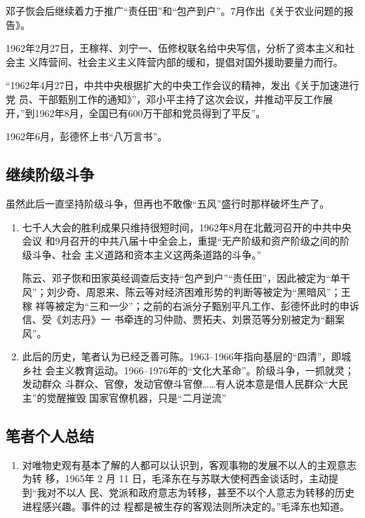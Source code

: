 {\begin{enumerate}
  邓子恢会后继续着力于推广“责任田”和“包产到户”。7月作出《关于农业问题的报
  告》。

  1962年2月27日，王稼祥、刘宁一、伍修权联名给中央写信，分析了资本主义和社会主
  义阵营间、社会主义主义阵营内部的缓和，提倡对国外援助要量力而行。

  “1962年4月27日，中共中央根据扩大的中央工作会议的精神，发出《关于加速进行党
  员、干部甄别工作的通知》”，邓小平主持了这次会议，并推动平反工作展
  开，”到1962年8月，全国已有600万干部和党员得到了平反”。

  1962年6月，彭德怀上书“八万言书”。
\end{enumerate}

\subsection{继续阶级斗争}

虽然此后一直坚持阶级斗争，但再也不敢像“五风”盛行时那样破坏生产了。

\begin{enumerate}
\item 七千人大会的胜利成果只维持很短时间，1962年8月在北戴河召开的中共中央会议
  和9月召开的中共八届十中全会上，重提“无产阶级和资产阶级之间的阶级斗争、社会
  主义道路和资本主义这两条道路的斗争。”

  陈云、邓子恢和田家英经调查后支持“包产到户”“责任田”，因此被定为“单干
  风”；刘少奇、周恩来、陈云等对经济困难形势的判断等被定为“黑暗风”；王稼
  祥等被定为“三和一少”；之前的右派分子甄别平凡工作、彭德怀此时的申诉信、受《刘志丹》一
  书牵连的习仲勋、贾拓夫、刘景范等分别被定为“翻案风”。

\item 此后的历史，笔者认为已经乏善可陈。1963--1966年指向基层的“四清”，即城乡社
  会主义教育运动。1966--1976年的“文化大革命”。阶级斗争，一抓就灵；发动群众
  斗群众、官僚，发动官僚斗官僚……有人说本意是借人民群众“大民主”的觉醒摧毁
  国家官僚机器，只是“二月逆流”
\end{enumerate}

\subsection{笔者个人总结}

\begin{enumerate}
\item 对唯物史观有基本了解的人都可以认识到，客观事物的发展不以人的主观意志为转
  移，1965年 2 月 11 日，毛泽东在与苏联大使柯西金谈话时，主动提到“我对不以人
  民、党派和政府意志为转移，甚至不以个人意志为转移的历史进程感兴趣。事件的过
  程都是被生存的客观法则所决定的。”毛泽东也知道。


\end{enumerate}}
